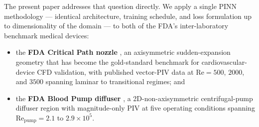 \documentclass[12pt,a4paper]{article}
\newcommand{\Reyn}{\mathrm{Re}}    %
\begin{document}
The present paper addresses that question directly. We apply a
single PINN methodology --- identical architecture, training
schedule, and loss formulation up to dimensionality of the
domain --- to both of the FDA's inter-laboratory benchmark
medical devices:
\begin{itemize}[leftmargin=*, itemsep=2pt]
  \item the \textbf{FDA Critical Path nozzle}
    \cite{Hariharan2011FDA, Stewart2012FDA}, an axisymmetric
    sudden-expansion geometry that has become the gold-standard
    benchmark for cardiovascular-device CFD validation, with
    published vector-PIV data at $\Reyn = 500$, $2000$, and
    $3500$ spanning laminar to transitional regimes; and
  \item the \textbf{FDA Blood Pump diffuser}
    \cite{Hariharan2018BloodPump, Malinauskas2017FDA,
    Ponnaluri2023PumpCFD}, a 2D-non-axisymmetric centrifugal-pump
    diffuser region with magnitude-only PIV at five operating
    conditions spanning $\Reyn_{\text{pump}} = 2.1$ to $2.9
    \times 10^5$.
\end{itemize}
\end{document}
